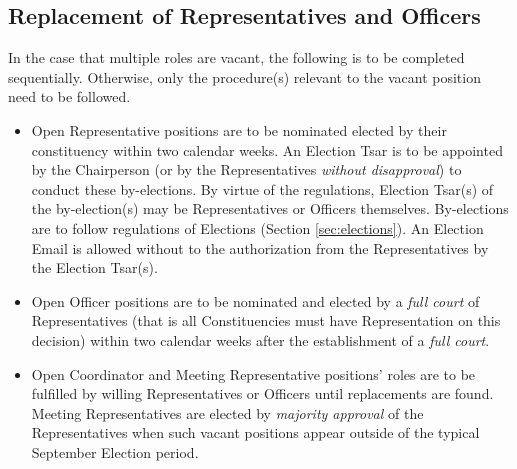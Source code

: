 \documentclass[8pt]{article}
\begin{document}
	\subsection{Replacement of Representatives and Officers}
	In the case that multiple roles are vacant, the following is to be completed sequentially. Otherwise, only the procedure(s) relevant to the vacant position need to be followed. 
	\begin{itemize}
		\item Open Representative positions are to be nominated elected by their constituency within two calendar weeks. An Election Tsar is to be appointed by the Chairperson (or by the Representatives \textit{without disapproval}) to conduct these by-elections. By virtue of the regulations, Election Tsar(s) of the by-election(s) may be Representatives or Officers themselves. By-elections are to follow regulations of Elections (Section \ref{sec:elections}). An Election Email is allowed without to the authorization from the Representatives by the Election Tsar(s).
		\item Open Officer positions are to be nominated and elected by a \textit{full court} of Representatives (that is all Constituencies must have Representation on this decision) within two calendar weeks after the establishment of a \textit{full court}.
		\item Open Coordinator and Meeting Representative positions' roles are to be fulfilled by willing Representatives or Officers until replacements are found. Meeting Representatives are elected by \textit{majority approval} of the Representatives when such vacant positions appear outside of the typical September Election period.
	\end{itemize}
\end{document}
